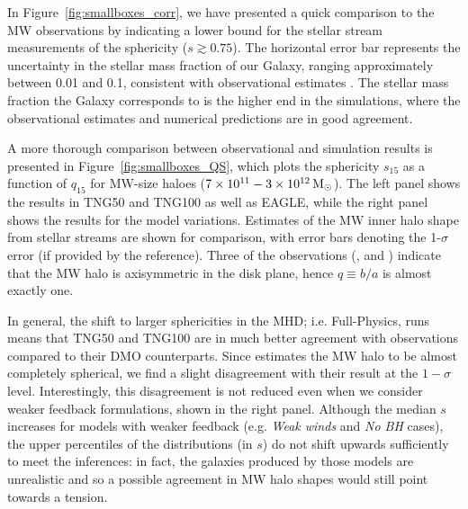 \documentclass[fleqn,usenatbib]{mnras}
\def\msun{\,\rm M_{\odot}}
\newcommand{\ap}[1]{{\color{magenta} #1}}
\begin{document}

In Figure~\ref{fig:smallboxes_corr}, we have presented a quick comparison to the MW observations by indicating a lower bound for the stellar stream measurements of the sphericity ($s \gtrsim 0.75$).
The horizontal error bar represents the uncertainty in the stellar mass fraction of our Galaxy, ranging approximately between 0.01 and 0.1, consistent with  observational estimates \cite[e.g.][]{Zaritsky20v888}.
The stellar mass fraction the Galaxy corresponds to is the higher end in the simulations, where the observational estimates and numerical predictions are in good agreement.


A more thorough comparison between observational and simulation results is presented in Figure~\ref{fig:smallboxes_QS}, which plots the sphericity $s_{15}$ as a function of $q_{15}$ for MW-size haloes ($7\times 10^{11} - 3\times 10^{12} \msun$).
The left panel shows the results in TNG50 and TNG100 as well as EAGLE, while the right panel shows the results for the model variations.
Estimates of the MW inner halo shape from stellar streams are shown for comparison, with error bars denoting the 1-$\sigma$ error (if provided by the reference).
Three of the observations (\citealt{Vera-Ciro13v773}, \citealt{Bovy16v833} and \citealt{Malhan19v487}) indicate that the MW halo is axisymmetric in the disk plane, hence $q \equiv b/a$ is almost exactly one.

In general, the shift to larger sphericities in the MHD; i.e. Full-Physics, runs means that TNG50 and TNG100 are in much better agreement with observations compared to their DMO counterparts.
Since \cite{Bovy16v833} estimates the MW halo to be almost completely spherical, we find a slight disagreement with their result at the $1-\sigma$ level.
Interestingly, this disagreement is not reduced even when we consider weaker feedback formulations, shown in the right panel.
Although the median $s$ increases for models with weaker feedback (e.g. \emph{Weak winds} and \emph{No BH} cases), the upper percentiles of the distributions (in $s$) do not shift upwards sufficiently to meet the \cite{Bovy16v833} inferences: in fact, the galaxies produced by those models are unrealistic and so a possible agreement in MW halo shapes would still point towards a tension.
\end{document}
